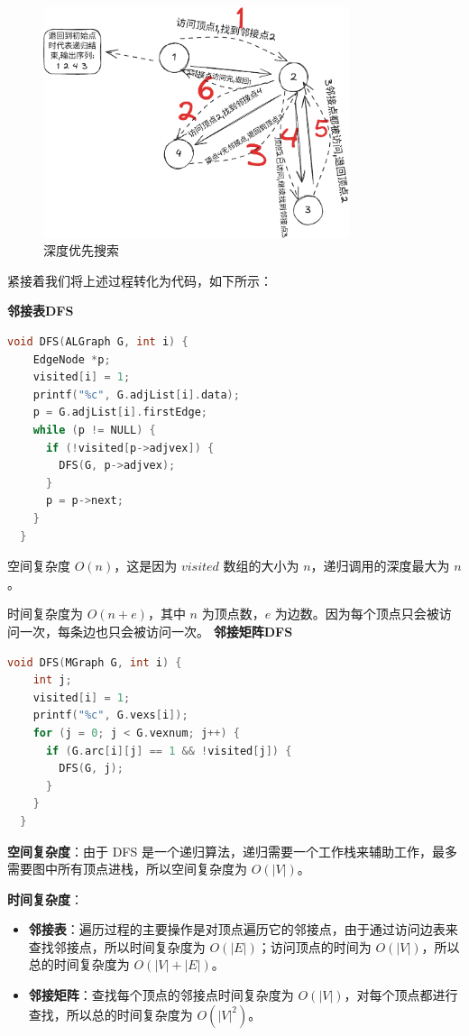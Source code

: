 \documentclass[lang=cn,newtx,10pt,scheme=chinese]{elegantbook}
\begin{document}
\begin{figure}[h!]
  \centering
  \includegraphics[width=0.8\textwidth]{./figure/pdf/cropped/depthFirst.pdf}
  \caption{深度优先搜索}
  \label{fig:depthFirst}
\end{figure}

紧接着我们将上述过程转化为代码，如下所示：

\textbf{邻接表DFS}

\begin{lstlisting}[language=C++, caption={邻接表DFS}]
  void DFS(ALGraph G, int i) {
    EdgeNode *p;
    visited[i] = 1;
    printf("%c", G.adjList[i].data);
    p = G.adjList[i].firstEdge;
    while (p != NULL) {
      if (!visited[p->adjvex]) {
        DFS(G, p->adjvex);
      }
      p = p->next;
    }
  }
\end{lstlisting}

空间复杂度 $O(n)$，这是因为 $visited$ 数组的大小为 $n$，递归调用的深度最大为 $n$。

时间复杂度为 $O(n+e)$，其中 $n$ 为顶点数，$e$ 为边数。因为每个顶点只会被访问一次，每条边也只会被访问一次。
\textbf{邻接矩阵DFS}

\begin{lstlisting}[language=C++, caption={邻接矩阵DFS}]
  void DFS(MGraph G, int i) {
    int j;
    visited[i] = 1;
    printf("%c", G.vexs[i]);
    for (j = 0; j < G.vexnum; j++) {
      if (G.arc[i][j] == 1 && !visited[j]) {
        DFS(G, j);
      }
    }
  }
\end{lstlisting}

\textbf{空间复杂度}：由于 DFS 是一个递归算法，递归需要一个工作栈来辅助工作，最多需要图中所有顶点进栈，所以空间复杂度为 $O(|V|)$。

\textbf{时间复杂度}：
\begin{itemize}
  \item \textbf{邻接表}：遍历过程的主要操作是对顶点遍历它的邻接点，由于通过访问边表来查找邻接点，所以时间复杂度为 $O(|E|)$；访问顶点的时间为 $O(|V|)$，所以总的时间复杂度为 $O(|V| + |E|)$。
  \item \textbf{邻接矩阵}：查找每个顶点的邻接点时间复杂度为 $O(|V|)$，对每个顶点都进行查找，所以总的时间复杂度为 $O(|V|^2)$。
\end{itemize}
\end{document}
